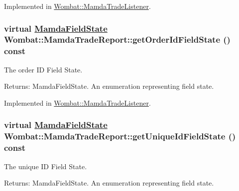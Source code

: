 Implemented in \hyperlink{classWombat_1_1MamdaTradeListener_f8e874c8dc039fb83f1e9f4a8bdcbc6f}{Wombat::Mamda\-Trade\-Listener}.\hypertarget{classWombat_1_1MamdaTradeReport_544b8f3a730cfc1553bdc756372cd12b}{
\subsubsection[getOrderIdFieldState]{\setlength{\rightskip}{0pt plus 5cm}virtual \hyperlink{namespaceWombat_93aac974f2ab713554fd12a1fa3b7d2a}{Mamda\-Field\-State} Wombat::Mamda\-Trade\-Report::get\-Order\-Id\-Field\-State () const}}
\label{classWombat_1_1MamdaTradeReport_544b8f3a730cfc1553bdc756372cd12b}


The order ID Field State. 

\begin{Desc}
\item[Returns:]Mamda\-Field\-State. An enumeration representing field state. \end{Desc}


Implemented in \hyperlink{classWombat_1_1MamdaTradeListener_f0f77145439c12c8bae3640307b50401}{Wombat::Mamda\-Trade\-Listener}.\hypertarget{classWombat_1_1MamdaTradeReport_32722ba8f872d14f9790fd3869b17640}{
\subsubsection[getUniqueIdFieldState]{\setlength{\rightskip}{0pt plus 5cm}virtual \hyperlink{namespaceWombat_93aac974f2ab713554fd12a1fa3b7d2a}{Mamda\-Field\-State} Wombat::Mamda\-Trade\-Report::get\-Unique\-Id\-Field\-State () const}}
\label{classWombat_1_1MamdaTradeReport_32722ba8f872d14f9790fd3869b17640}


The unique ID Field State. 

\begin{Desc}
\item[Returns:]Mamda\-Field\-State. An enumeration representing field state. \end{Desc}


